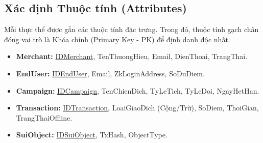 \subsection{Xác định Thuộc tính (Attributes)}
Mỗi thực thể được gắn các thuộc tính đặc trưng. Trong đó, thuộc tính gạch chân đóng vai trò là Khóa chính (Primary Key - PK) để định danh độc nhất.

\begin{itemize}
    \item \textbf{Merchant:} \underline{IDMerchant}, TenThuongHieu, Email, DienThoai, TrangThai.
    \item \textbf{EndUser:} \underline{IDEndUser}, Email, ZkLoginAddress, SoDuDiem.
    \item \textbf{Campaign:} \underline{IDCampaign}, TenChienDich, TyLeTich, TyLeDoi, NgayHetHan.
    \item \textbf{Transaction:} \underline{IDTransaction}, LoaiGiaoDich (Cộng/Trừ), SoDiem, ThoiGian, TrangThaiOffline.
    \item \textbf{SuiObject:} \underline{IDSuiObject}, TxHash, ObjectType.
\end{itemize}